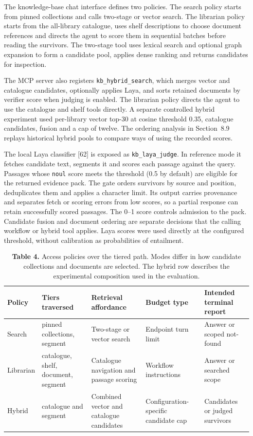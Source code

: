 The knowledge-base chat interface defines two policies. The search policy
starts from pinned collections and calls two-stage or vector search. The
librarian policy starts from the all-library catalogue, uses shelf
descriptions to choose document references and directs the agent to score
them in sequential batches before reading the survivors. The two-stage
tool uses lexical search and optional graph expansion to form a candidate
pool, applies dense ranking and returns candidates for inspection.

The MCP server also registers \texttt{kb\_hybrid\_search}, which merges vector
and catalogue candidates, optionally applies Laya, and sorts retained
documents by verifier score when judging is enabled. The librarian policy
directs the agent to use the catalogue and shelf tools directly. A separate
controlled hybrid experiment used per-library vector top-30 at cosine
threshold 0.35, catalogue candidates, fusion and a cap of twelve. The
ordering analysis in Section~8.9 replays historical hybrid pools
to compare ways of using the recorded scores.

The local Laya classifier [62] is exposed as \texttt{kb\_laya\_judge}.
In reference mode it fetches candidate text, segments it and scores each
passage against the query. Passages whose \texttt{noul} score meets the
threshold (0.5 by default) are eligible for the returned evidence pack.
The gate orders survivors by source and position, deduplicates them and
applies a character limit. Its output carries provenance and separates
fetch or scoring errors from low scores, so a partial response can
retain successfully scored passages. The 0--1 score controls admission
to the pack. Candidate fusion and document ordering are separate
decisions that the calling workflow or hybrid tool applies. Laya scores
were used directly at the configured threshold, without calibration as
probabilities of entailment.

\begin{table}
\centering
\small
\setlength{\tabcolsep}{5pt}
\caption{\textbf{Table 4.} Access policies over the tiered path. Modes differ in how candidate collections and documents are selected.
The hybrid row describes the experimental composition used in the evaluation.}

\begin{tabular}{@{}p{1.815cm}p{3.135cm}p{3.960cm}p{2.640cm}p{3.300cm}@{}}
\toprule
Policy & Tiers traversed & Retrieval affordance & Budget type & Intended terminal report\\
\midrule
Search & pinned collections, segment & Two-stage or vector search & Endpoint turn limit & Answer or scoped not-found\\
Librarian & catalogue, shelf, document, segment & Catalogue navigation and passage scoring & Workflow instructions & Answer or searched scope\\
Hybrid & catalogue and segment & Combined vector and catalogue candidates & Configuration-specific candidate cap & Candidates or judged survivors\\
\bottomrule
\end{tabular}
\end{table}

